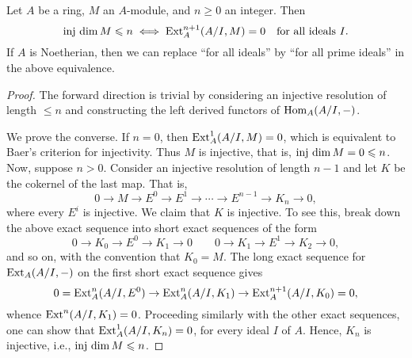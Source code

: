 \begin{lemma}
    Let $A$ be a ring, $M$ an $A$-module, and $n\ge 0$ an integer. Then 
    \begin{equation*}
        \operatorname{inj~dim} M\leqslant n\iff \operatorname{Ext}^{n + 1}_A(A/I, M) = 0\quad\text{for all ideals } I.
    \end{equation*}
    If $A$ is Noetherian, then we can replace ``for all ideals'' by ``for all prime ideals'' in the above equivalence.
\end{lemma}
\begin{proof}
    The forward direction is trivial by considering an injective resolution of length $\le n$ and constructing the left derived functors of $\operatorname{Hom}_A(A/I, -)$.

    We prove the converse. If $n = 0$, then $\operatorname{Ext}^1_A(A/I, M) = 0$, which is equivalent to Baer's criterion for injectivity. Thus $M$ is injective, that is, $\operatorname{inj~dim} M = 0\leqslant n$. Now, suppose $n > 0$. Consider an injective resolution of length $n - 1$ and let $K$ be the cokernel of the last map. That is, 
    \begin{equation*}
        0\to M\to E^0\to E^1\to\cdots\to E^{n - 1}\to K_n\to 0,
    \end{equation*}
    where every $E^i$ is injective. We claim that $K$ is injective. To see this, break down the above exact sequence into short exact sequences of the form 
    \begin{equation*}
        0\to K_0\to E^0\to K_1\to 0\qquad 0\to K_1\to E^1\to K_2\to 0,
    \end{equation*}
    and so on, with the convention that $K_0 = M$. The long exact sequence for $\operatorname{Ext}_A(A/I, -)$ on the first short exact sequence gives 
    \begin{equation*}
        0 = \operatorname{Ext}^n_A(A/I, E^0)\to\operatorname{Ext}^n_A(A/I, K_1)\to\operatorname{Ext}^{n + 1}_A(A/I, K_0) = 0,
    \end{equation*}
    whence $\operatorname{Ext}^n(A/I, K_1) = 0$. Proceeding similarly with the other exact sequences, one can show that $\operatorname{Ext}^1_A(A/I, K_n) = 0$, for every ideal $I$ of $A$. Hence, $K_n$ is injective, i.e., $\operatorname{inj~dim} M\leqslant n$.
\end{proof}


